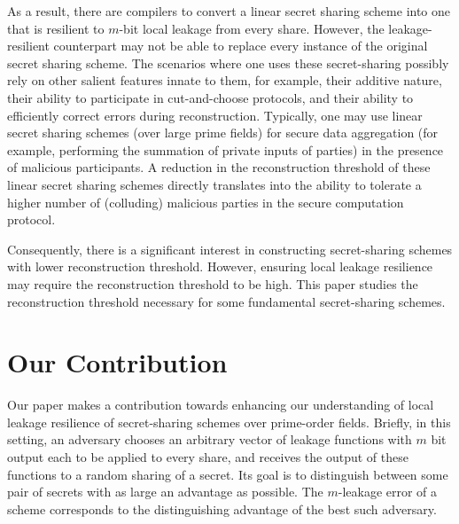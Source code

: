 As a result, there are compilers to convert a linear secret sharing scheme into one that is resilient to $m$-bit local leakage from every share. 
However, the leakage-resilient counterpart may not be able to replace every instance of the original secret sharing scheme. 
The scenarios where one uses these secret-sharing possibly rely on other salient features innate to them, for example, their additive nature, their ability to participate in cut-and-choose protocols, and their ability to efficiently correct errors during reconstruction. 
Typically, one may use linear secret sharing schemes (over large prime fields) for secure data aggregation (for example, performing the summation of private inputs of parties) in the presence of malicious participants. 
A reduction in the reconstruction threshold of these linear secret sharing schemes directly translates into the ability to tolerate a higher number of (colluding) malicious parties in the secure computation protocol. 

Consequently, there is a significant interest in constructing secret-sharing schemes with lower reconstruction threshold. 
However, ensuring local leakage resilience may require the reconstruction threshold to be high. 
This paper studies the reconstruction threshold necessary for some fundamental secret-sharing schemes.



\section {Our Contribution}


Our paper makes a contribution towards enhancing our understanding of local leakage resilience of secret-sharing schemes over prime-order fields. Briefly, in this setting, an adversary chooses an arbitrary vector of leakage functions with $m$ bit output each to be applied to every share, and receives the output of these functions to a random sharing of a secret. Its goal is to distinguish between some pair of secrets with as large an advantage as possible. The $m$-leakage error of a scheme corresponds to the distinguishing advantage of the best such adversary. %

